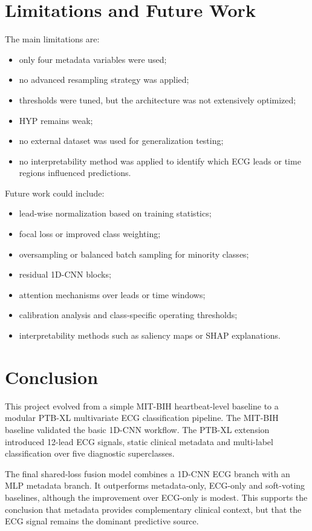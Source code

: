 \documentclass[11pt,a4paper]{article}
\begin{document}
\section{Limitations and Future Work}

The main limitations are:
\begin{itemize}[noitemsep]
    \item only four metadata variables were used;
    \item no advanced resampling strategy was applied;
    \item thresholds were tuned, but the architecture was not extensively optimized;
    \item HYP remains weak;
    \item no external dataset was used for generalization testing;
    \item no interpretability method was applied to identify which ECG leads or time regions influenced predictions.
\end{itemize}

Future work could include:
\begin{itemize}[noitemsep]
    \item lead-wise normalization based on training statistics;
    \item focal loss or improved class weighting;
    \item oversampling or balanced batch sampling for minority classes;
    \item residual 1D-CNN blocks;
    \item attention mechanisms over leads or time windows;
    \item calibration analysis and class-specific operating thresholds;
    \item interpretability methods such as saliency maps or SHAP explanations.
\end{itemize}

\section{Conclusion}

This project evolved from a simple MIT-BIH heartbeat-level baseline to a modular PTB-XL multivariate ECG classification pipeline. The MIT-BIH baseline validated the basic 1D-CNN workflow. The PTB-XL extension introduced 12-lead ECG signals, static clinical metadata and multi-label classification over five diagnostic superclasses.

The final shared-loss fusion model combines a 1D-CNN ECG branch with an MLP metadata branch. It outperforms metadata-only, ECG-only and soft-voting baselines, although the improvement over ECG-only is modest. This supports the conclusion that metadata provides complementary clinical context, but that the ECG signal remains the dominant predictive source.
\end{document}

